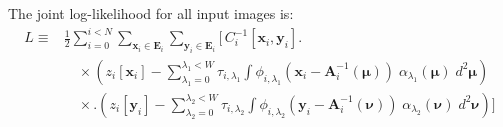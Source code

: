 \documentclass[DM,authoryear,toc]{lsstdoc}
\begin{document}
The joint log-likelihood for all input images is:
\begin{align}
L \equiv &
    \frac{1}{2} \sum_{i=0}^{i<N}
        \sum_{\bm{x}_i \in \bm{E}_i}
        \sum_{\bm{y}_i \in \bm{E}_i}
        \Bigg[
        \,C_i^{-1}[\bm{x}_i, \bm{y}_i]
        \Bigg.
        \nonumber\\
    & \quad \times
        \left(
            z_i[\bm{x}_i]
            - \sum_{\lambda_1=0}^{\lambda_1 < W} \tau_{i,\lambda_1}
                \int\!
                \phi_{i,\lambda_1}\!\left(
                    \bm{x}_i - \bm{A}_i^{-1}(\bm{\mu})
                \right)
                \; \alpha_{\lambda_1}(\bm{\mu})
                \; d^2\bm{\mu}
        \right) \nonumber\\
    & \quad \times
    \Bigg.
        \left(
            z_i[\bm{y}_i]
            - \sum_{\lambda_2=0}^{\lambda_2 < W} \tau_{i,\lambda_2}
                \int\!
                \phi_{i,\lambda_2}\!\left(
                    \bm{y}_i - \bm{A}_i^{-1}(\bm{\nu})
                \right)
                \; \alpha_{\lambda_2}(\bm{\nu})
                \; d^2\bm{\nu}
        \right)
    \Bigg]
\end{align}
\end{document}
